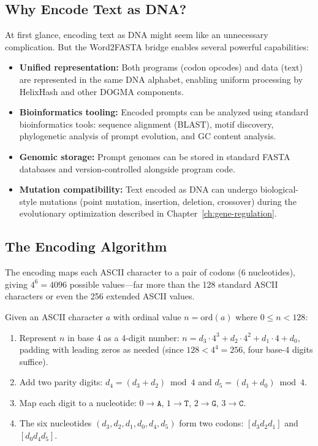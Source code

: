 \subsection{Why Encode Text as DNA?}

At first glance, encoding text as DNA might seem like an unnecessary complication. But the Word2FASTA bridge enables several powerful capabilities:

\begin{itemize}[leftmargin=1.8em]
  \item \textbf{Unified representation:} Both programs (codon opcodes) and data (text) are represented in the same DNA alphabet, enabling uniform processing by HelixHash and other DOGMA components.
  \item \textbf{Bioinformatics tooling:} Encoded prompts can be analyzed using standard bioinformatics tools: sequence alignment (BLAST), motif discovery, phylogenetic analysis of prompt evolution, and GC content analysis.
  \item \textbf{Genomic storage:} Prompt genomes can be stored in standard FASTA databases and version-controlled alongside program code.
  \item \textbf{Mutation compatibility:} Text encoded as DNA can undergo biological-style mutations (point mutation, insertion, deletion, crossover) during the evolutionary optimization described in Chapter~\ref{ch:gene-regulation}.
\end{itemize}

\subsection{The Encoding Algorithm}

The encoding maps each ASCII character to a pair of codons (6 nucleotides), giving $4^6 = 4096$ possible values---far more than the 128 standard ASCII characters or even the 256 extended ASCII values.

\begin{definition}
\label{def:word2fasta}
Given an ASCII character $a$ with ordinal value $n = \text{ord}(a)$ where $0 \le n < 128$:
\begin{enumerate}[leftmargin=1.5em]
  \item Represent $n$ in base 4 as a 4-digit number: $n = d_3 \cdot 4^3 + d_2 \cdot 4^2 + d_1 \cdot 4 + d_0$, padding with leading zeros as needed (since $128 < 4^4 = 256$, four base-4 digits suffice).
  \item Add two parity digits: $d_4 = (d_3 + d_2) \bmod 4$ and $d_5 = (d_1 + d_0) \bmod 4$.
  \item Map each digit to a nucleotide: $0 \to \texttt{A}$, $1 \to \texttt{T}$, $2 \to \texttt{G}$, $3 \to \texttt{C}$.
  \item The six nucleotides $(d_3, d_2, d_1, d_0, d_4, d_5)$ form two codons: $[d_3 d_2 d_1]$ and $[d_0 d_4 d_5]$.
\end{enumerate}
\end{definition}


